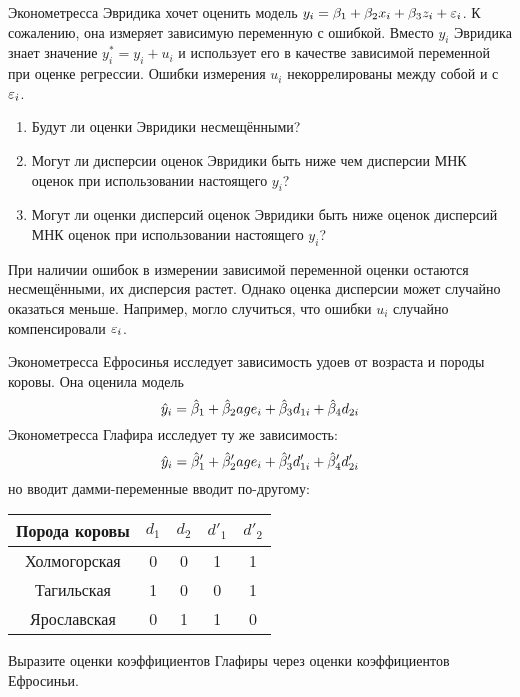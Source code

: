 \begin{problem}
Эконометресса Эвридика хочет оценить модель $y_i=\beta_1 + \beta_2 x_i +\beta_3 z_i + \varepsilon_i$. К сожалению, она измеряет зависимую переменную с ошибкой. Вместо $y_i$ Эвридика знает значение $y_i^*=y_i+u_i$ и использует его в качестве зависимой переменной при оценке регрессии. Ошибки измерения $u_i$ некоррелированы между собой и с $\varepsilon_i$.
\begin{enumerate}
\item Будут ли оценки Эвридики несмещёнными?
\item Могут ли дисперсии оценок Эвридики быть ниже чем дисперсии МНК оценок при использовании настоящего $y_i$?
\item Могут ли оценки дисперсий оценок Эвридики быть ниже оценок дисперсий МНК оценок при использовании настоящего $y_i$?
\end{enumerate}



\begin{sol}
При наличии ошибок в измерении зависимой переменной оценки остаются несмещёнными, их дисперсия растет. Однако оценка дисперсии может случайно оказаться меньше. Например, могло случиться, что ошибки $u_i$ случайно компенсировали $\varepsilon_i$.
\end{sol}
\end{problem}


\begin{problem}
Эконометресса Ефросинья исследует зависимость удоев от возраста и породы коровы. Она оценила модель
\[
\hat{y}_i = \hat{\beta}_1 + \hat{\beta}_2 age_i +\hat{\beta}_3 d_{1i} + \hat{\beta}_4 d_{2i}
\]
Эконометресса Глафира исследует ту же зависимость:
\[
\hat{y}_i = \hat{\beta}'_1 + \hat{\beta}'_2 age_i +\hat{\beta}'_3 d'_{1i} + \hat{\beta}'_4 d'_{2i}
\]
но вводит дамми-переменные вводит по-другому:

\begin{tabular}{c|cccc}
\toprule
Порода коровы & $d_1$ & $d_2$ & $d'_1$ & $d'_2$  \\
\midrule
Холмогорская & 0 & 0 & 1 & 1 \\
Тагильская & 1 & 0 & 0 & 1  \\
Ярославская & 0 & 1 & 1 & 0  \\
\bottomrule
\end{tabular}

Выразите оценки коэффициентов Глафиры через оценки коэффициентов Ефросиньи.


\begin{sol}
\end{sol}
\end{problem}


